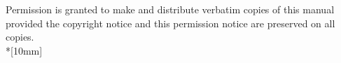 \documentclass[12pt,a4paper]{book}
\begin{document}
Permission is granted to make and distribute verbatim copies of this manual
provided the copyright notice and this permission notice are preserved on
all copies.\\*[10mm]

\tableofcontents

\cleardoublepage
{}
\setcounter{page}{1}




%






\end{document}
